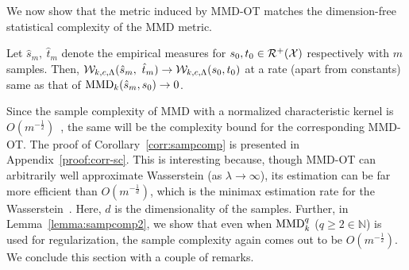 We now show that the metric induced by MMD-OT matches the dimension-free statistical complexity of the MMD metric.
 \begin{corollaryBox}
\begin{corollary}
\label{corr:sampcomp}
    Let $\hat{s}_m,\ \hat{t}_m$ denote the empirical measures for $s_0,t_0 \in\mathcal{R}^+(\mathcal{X})$ respectively with $m$ samples. Then, $\calU(\hat{s}_m,\ \hat{t}_m)\rightarrow\calU(s_0,t_0)$ at a rate (apart from constants) same as that of $\textup{MMD}_k(\hat{s}_m,s_0)\rightarrow0$. 
\end{corollary}
\end{corollaryBox}
Since the sample complexity of MMD with a normalized characteristic kernel is $O(m^{-\frac{1}{2}})$~\citep{SmolaGSS07}, the same will be the complexity bound for the corresponding MMD-OT. The proof of Corollary~\ref{corr:sampcomp} is presented in Appendix~\ref{proof:corr-sc}. This is interesting because, though MMD-OT can arbitrarily well approximate Wasserstein (as $\lambda\rightarrow\infty$), its estimation can be far more efficient than $O\left(m^{-\frac{1}{d}}\right)$, which is the minimax estimation rate for the Wasserstein~\citep{nilesweed2019estimation}. Here, $d$ is the dimensionality of the samples. Further, in Lemma~\ref{lemma:sampcomp2}, we show that even when $\textup{MMD}_k^q$ ($q\ge2\in \mathbb{N}$) is used for regularization, the sample complexity again comes out to be $O\left(m^{-\frac{1}{2}}\right)$. We conclude this section with a couple of remarks.

